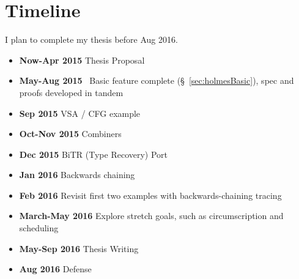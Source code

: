\section{Timeline}
I plan to complete my thesis before Aug 2016.
\begin{itemize}[label={}]
\item {\bf Now-Apr 2015} Thesis Proposal
\item {\bf May-Aug 2015} \sysname\ Basic feature complete (\S~\ref{sec:holmesBasic}), spec and proofs developed in tandem
\item {\bf Sep 2015} VSA / CFG example
\item {\bf Oct-Nov 2015} Combiners
\item {\bf Dec 2015} BiTR (Type Recovery) Port
\item {\bf Jan 2016} Backwards chaining
\item {\bf Feb 2016} Revisit first two examples with backwards-chaining tracing
\item {\bf March-May 2016} Explore stretch goals, such as circumscription and scheduling 
\item {\bf May-Sep 2016} Thesis Writing
\item {\bf Aug 2016} Defense
\end{itemize}
